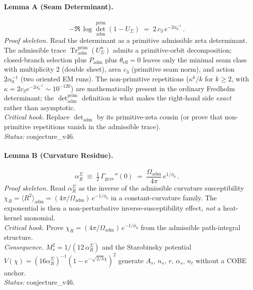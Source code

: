 \documentclass[11pt,a4paper]{article}
\begin{document}
\paragraph{Lemma A (Seam Determinant).}
\begin{equation}
-\Re\,\log\det_{\mathrm{adm}}^{\mathrm{prim}}(1-U_\Sigma) \;=\;
2\,c_3\,e^{-2\alpha_0^{-1}} \,.
\label{eq:lemmaA}
\end{equation}
\emph{Proof skeleton.} Read the determinant as a primitive admissible
zeta determinant.  The admissible trace
\(\operatorname{Tr}_{\mathrm{adm}}^{\mathrm{prim}}(U_\Sigma^n)\) admits
a primitive-orbit decomposition; closed-branch selection plus
\(P_{\mathrm{adm}}\) plus \(\theta_{\mathrm{eff}}=0\) leaves only the
minimal seam class with multiplicity 2 (double sheet), area \(c_3\)
(primitive seam norm), and action \(2\alpha_0^{-1}\) (two oriented EM
runs).  The non-primitive repetitions (\(\kappa^k/k\) for \(k\ge 2\),
with \(\kappa=2c_3 e^{-2\alpha_0^{-1}}\sim 10^{-120}\)) are
mathematically present in the ordinary Fredholm determinant; the
\(\det_{\mathrm{adm}}^{\mathrm{prim}}\) definition is what makes the
right-hand side \emph{exact} rather than asymptotic.\\
\emph{Critical hook.} Replace
\(\det_{\mathrm{adm}}\) by its primitive-zeta cousin (or prove that
non-primitive repetitions vanish in the admissible trace).\\
\emph{Status:} \textsf{conjecture\_v46}.

\paragraph{Lemma B (Curvature Residue).}
\begin{equation}
\alpha_R^\Sigma \;\equiv\;
\tfrac12\,\Gamma_{\mathrm{grav}}''(0) \;=\;
\frac{\Omega_{\mathrm{adm}}}{4\pi}\,e^{1/\phi_0} \,.
\label{eq:lemmaB}
\end{equation}
\emph{Proof skeleton.} Read \(\alpha_R^\Sigma\) as the inverse of the
admissible curvature susceptibility
\(\chi_R = \langle R^2\rangle_{\mathrm{adm}}
= (4\pi/\Omega_{\mathrm{adm}})\,e^{-1/\phi_0}\) in a constant-curvature
family.  The exponential is then a non-perturbative
inverse-susceptibility effect, \emph{not} a heat-kernel monomial.\\
\emph{Critical hook.} Prove
\(\chi_R = (4\pi/\Omega_{\mathrm{adm}})\,e^{-1/\phi_0}\) from the
admissible path-integral structure.\\
\emph{Consequence.} \(M_s^2 = 1/(12\,\alpha_R^\Sigma)\) and the
Starobinsky potential \(V(\chi)=
(16\alpha_R^\Sigma)^{-1}(1-e^{-\sqrt{2/3}\chi})^2\) generate
\(A_s,\,n_s,\,r,\,\alpha_s,\,n_t\) without a COBE anchor.\\
\emph{Status:} \textsf{conjecture\_v46}.
\end{document}
